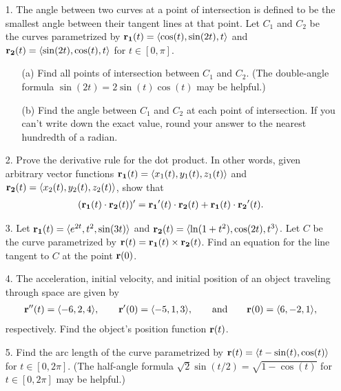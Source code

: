 \documentclass[reqno, 12pt]{amsart}
\begin{document}
\newpage
\begin{itemize}
\item[1.] The angle between two curves at a point of intersection is defined to be the smallest angle between their tangent lines at that point. Let $C_1$ and $C_2$ be the curves parametrized by ${\bf r_1}(t) = \langle \cos(t),\sin(2t),t\rangle$ and ${\bf r_2}(t) = \langle \sin(2t), \cos(t), t\rangle$ for $t \in [0,\pi]$.

\medskip
\begin{itemize}
\item[(a)] Find all points of intersection between $C_1$ and $C_2$. (The double-angle formula $\sin(2t) = 2\sin(t)\cos(t)$ may be helpful.)

\vspace{4 in}
\item[(b)] Find the angle between $C_1$ and $C_2$ at each point of intersection. If you can't write down the exact value, round your answer to the nearest hundredth of a radian.
\end{itemize}

\newpage
\item[2.] Prove the derivative rule for the dot product. In other words, given arbitrary vector functions ${\bf r_1}(t) = \langle x_1(t), y_1(t), z_1(t)\rangle$ and ${\bf r_2}(t) = \langle x_2(t), y_2(t), z_2(t)\rangle$, show that
\begin{align*}
({\bf r_1}(t)\cdot{\bf r_2}(t))' = {\bf r_1}'(t)\cdot{\bf r_2}(t) + {\bf r_1}(t)\cdot{\bf r_2}'(t).
\end{align*}

\newpage
\item[3.] Let ${\bf r_1}(t) = \langle e^{2t}, t^2, \sin(3t)\rangle$ and ${\bf r_2}(t) = \langle \ln(1+t^2), \cos(2t), t^3\rangle$. Let $C$ be the curve parametrized by ${\bf r}(t) = {\bf r_1}(t) \times {\bf r_2}(t)$. Find an equation for the line tangent to $C$ at the point ${\bf r}(0)$.

\newpage
\item[4.] The acceleration, initial velocity, and initial position of an object traveling through space are given by 
\begin{align*}
{\bf r}''(t) = \langle -6,2,4\rangle, \quad\quad {\bf r}'(0) = \langle -5,1,3\rangle, \quad\quad\text{and}\quad\quad {\bf r}(0) = \langle 6,-2,1\rangle,
\end{align*}
respectively. Find the object's position function ${\bf r}(t)$.

\newpage
\item[5.] Find the arc length of the curve parametrized by ${\bf r}(t) = \langle t-\sin(t), \cos(t)\rangle$ for $t \in [0,2\pi]$. (The half-angle formula $\sqrt{2}\sin(t/2) = \sqrt{1-\cos(t)}$ for $t \in [0,2\pi]$ may be helpful.)


\end{itemize}
\end{document}
